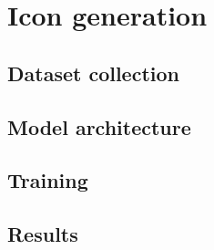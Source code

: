 \chapter{Icon generation}
\section{Dataset collection}\label{sec:icon-data}
\section{Model architecture}
\section{Training}
\section{Results}

